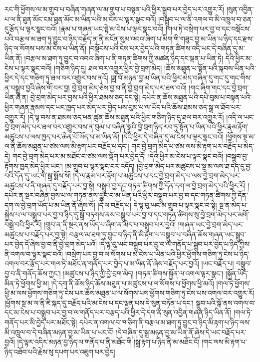 རང་གི་ཕྱོགས་ལ་མ་གྲུབ་པ་བཞིན་གཞན་ལ་མ་གྲུབ་པ་བསྟན་པའི་ཕྱིར་སྒྲུབ་པར་བྱེད་པར་འགྱུར་རོ། །སུན་འབྱིན་པ་ལ་ནི་ཐུན་མོང་ངམ་ཐུན་མོང་མ་ཡིན་པའི་མ་ངེས་པ་ལྟར་སྣང་བའོ། །བསྒྲུབ་པ་ལ་ནི་འགལ་བ་མི་འཁྲུལ་བ་ཅན་དུ་རྩོད་པ་ལྟར་སྣང་བའོ། །རྣམ་པ་གཞན་ཡང་སྟེ་མ་ངེས་པ་ལྟར་སྣང་བའོ། །གལ་ཏེ་བསྲེག་པར་བྱ་བ་དང་བསྡོངས་པའི་བརྩལ་མ་ཐག་ཏུ་བྱུང་བ་ཉིད་བརྗོད་ན་ནི་མངོན་སུམ་འབའ་ཞིག་པ་མིག་གི་གཟུང་བྱ་མ་ཡིན་པ་ཉིད་དང་རྫས་ཉིད་ལ་སོགས་པས་མ་ངེས་པ་ཡིན་ནོ། །བསྡོངས་པའི་ངེས་པར་བྱེད་པའི་གཏན་ཚིགས་འདི་ཡང་དེ་བཞིན་དུ་མ་ཡིན་ནོ། །བརྩལ་མ་ཐག་ཏུ་བྱུང་བ་འབའ་ཞིག་པ་ནི་གཏན་ཚིགས་ཀྱི་མཚན་ཉིད་དང་ལྡན་པ་ཡིན་ཏེ། དེའི་ཕྱིར་མ་ངེས་པ་ལྟར་སྣང་བའོ། །གཅིག་ཉིད་དུ། ཐལ་བར་འགྱུར་ཕྱིར་བྱེ་བྲག་མེད། །ཆོས་མཐུན་པ་སྟོན་པའི་སྐབས་ཡིན་པའི་ཕྱིར་དེ་དང་གཅིག་ཏུ་ཐལ་བར་འགྱུར་བས་ནའོ། །ཟླ་བོ་མཉན་བྱ་མ་ཡིན་པའི་ཕྱིར་མེད་བཞིན་དུ་གང་དུ་གང་གིས་ན་བསྒྲུབ་བྱའི་ཞེས་གོ་བར་བྱ། བྱེ་བྲག་མེད་ཅེས་བྱ་བ་ནི་བྱེ་བྲག་མེད་པར་ཐལ་བའོ། །གང་ཞིག་གང་དང་བྱེ་བྲག་ཡིན་ཞེ་ན། བྱེ་བྲག་མེད་པར་བྱས་པའི་ཕྱིར་ཐམས་ཅད་དང་སྟེ། དཔེར་ན་ཆོས་མཐུན་པའི་དཔེ་བུམ་པ་བསྟན་པའི་ཕྱིར་གཞན་རྣམས་དང་ཡང་ཁྱད་པར་མེད་པར་བྱེད་པས་བུམ་པ་ལ་ཡོད་པའི་ཆོས་ཐམས་ཅད་སྒྲ་ལ་ཐོབ་པར་འགྱུར་རོ། །དེ་ལྟ་བས་ན་ཐམས་ཅད་ཕན་ཚུན་ཆོས་མཐུན་པའི་ཕྱིར་གཅིག་ཉིད་དུ་ཐལ་བར་འགྱུར་རོ། །འདི་ལ་ཡང་བྱེ་བྲག་མེད་པར་ཐལ་བར་འགྱུར་བས་ན་བུམ་པ་བཞིན་སྒྲའི་བྱེ་བྲག་ཉིད་རབ་ཏུ་སྟོན་པ་ཡིན་པའི་ཕྱིར་རྣམ་རྟོག་མཚུངས་པ་ལས་ཁྱད་པར་ཆེན་པོ་ཡོད་པ་མ་ཡིན་ནོ། །དེའི་ཕྱིར་དེ་བཞིན་དུ་མ་ངེས་པ་ལྟར་སྣང་བའོ། །ཕྱོགས་སྔ་མ་ལ་ནི་ཆོས་མཐུན་པ་ཙམ་ལས་མི་རྟག་པར་བརྗོད་པ་དང་། གང་བྱེ་བྲག་མེད་པ་ཙམ་ལས་མི་རྟག་པར་བརྗོད་པ་མེད་དེ། གང་བྱེ་བྲག་མེད་པར་མ་མཐོང་བ་ཙམ་ལས་ལྡོག་པར་བྱེད་དོ། །དེའི་ཕྱིར་མ་ངེས་པ་ལྟར་སྣང་བའོ། །བསྒྲུབ་བྱ་རྟོགས་ཁྱད་མེད་ཕྱིར་ཡང་། །མ་གྲུབ་པ་ལྟར་སྣང་བར་འདོད། །བྱེ་བྲག་མེད་པར་མཚུངས་པ་སྔ་མ་ལས་ཐ་དད་དུ་བྱ་བའི་དོན་དུ་ཡང་གི་སྒྲ་སྨོས་སོ། །དེ་ལ་རྣམ་པར་རྟོག་པ་མཚུངས་པ་དང་བྱེ་བྲག་མེད་པ་ལས་བྱེ་བྲག་མེད་པར་མཚུངས་པ་ནི་གཞན་དུ་བརྗོད་པར་བྱ་སྟེ། བསྒྲུབ་བྱ་དང་གཏན་ཚིགས་ཀྱི་དོན་དག་ལ་བྱེ་བྲག་མེད་པའི་ཕྱིར་རོ། །དཔེར་ན་སྔར་བཞིན་བྱས་པ་ལ་གཏན་ནས་བྱུང་བ་མ་ཡིན་པའི་ཕྱིར་བསྒྲུབ་པར་བྱ་བ་དང་གཏན་ཚིགས་ཀྱི་དོན་དག་ལ་བྱེ་བྲག་ཡོད་པ་མ་ཡིན་ནོ་ཞེས་སོ། །དེ་ལ་བརྗོད་པ། དེ་ལྟ་བུ་ཡང་མ་གྲུབ་པ་ལྟར་སྣང་བ་སྟེ། སྔ་ན་མེད་པ་སྐྱེས་པ་ལ་བསྒྲུབ་པར་བྱ་བ་ཉིད་དུ་སྒྲོ་བཏགས་ནས་བསྒྲུབ་པར་བྱ་བ་དང་གཏན་ཚིགས་སུ་བྱེ་བྲག་མེད་པར་མགོ་བསྒྲེ་བའི་ཕྱིར་རོ། །གྲུབ་ན་ནི་སྔར་ནས་ཡོད་པ་ཞིག་ན་མེད་པ་བསྒྲུབ་པར་བྱའོ། །གཞན་ཡང་བྱེ་བྲག་མེད་པར་མཚུངས་པ་བརྗོད་པར་བྱ་སྟེ། བརྩལ་མ་ཐག་ཏུ་བྱུང་བ་ཉིད་ནི་མི་རྟག་པ་བསྒྲུབ་པ་བཞིན་ཆོས་གཞན་ཡང་སྒྲུབ་པར་བྱེད་དོ་ཞེས་བྱ་བ་ནི་བྱེ་བྲག་མེད་པའོ། །དེ་ལྟ་བུ་ཡང་བསྒྲུབ་པར་བྱ་བ་ལ་གནོད་པ་སྒྲུབ་པར་བྱེད་པ་ཉིད་ཀྱིས་ནི་འགལ་བ་ལྟར་སྣང་བའོ། །བསྲེག་པར་བྱ་བ་ལ་སོགས་པ་མ་ངེས་པ་ཡིན་པའི་ཕྱིར་ཕྱོགས་གཅིག་ཏུ་ངེས་པ་ཉིད་འགལ་བར་རྩོད་པར་གལ་ཏེ་མཐོང་ན་གནོད་པར་བྱེད་པ་མ་ཡིན་ནོ་ཞེས་བརྗོད་པར་བྱའོ། །ཡང་བརྗོད་པ། བསྒྲུབ་བྱ་བ་ནི་གནོད་ཆོས་ཀྱང་། །མཚུངས་པ་ཉིད་ཀྱི་བྱེ་བྲག་མེད། །གཏན་ཚིགས་སྐྱོན་ལ་འགལ་ལྟར་སྣང་། །སྐྱོན་ཡོད་མིན་ཏེ་ཕྱོགས་ཕྱི་མ། །དེ་དག་ནི་ཆོས་ཉིད་ཆོས་མཐུན་པ་མཚུངས་པ་ལ་སོགས་པ་ཕྱོགས་ཕྱི་མའོ། །གལ་ཏེ་ཕྱོགས་ཕྱི་མ་ལས་ཕྱོགས་གཅིག་ཏུ་ངེས་པར་ཆོས་མཐུན་པ་ལ་སོགས་པས་ཕྱོགས་གཅིག་ཏུ་ངེས་པས་འགལ་བར་འགྱུར་རོ། །ཕྱོགས་སྔ་མ་ལ་ནི་ཇི་སྐད་དུ་བརྗོད་པའི་མ་ངེས་པ་དང་ལྡན་པས་དེ་སུན་བཏོན་པ་དང་། སྒྲུབ་པའི་སྒོ་ནས་འགལ་བ་དང་མ་ངེས་པ་བསྒྲུབ་པར་བྱ་བ་ལ་གནོད་པར་བརྩད་པའི་ཕྱིར་དེ་དག་ནི་སུན་འབྱིན་གཞན་ཉིད་ཡིན་ནོ། །གལ་ཏེ་གནོད་པར་མི་བྱེད་པར་མཐོང་སྟེ། དཔེར་ན་འགལ་བ་ཁ་ཅིག་ནི་བརྩལ་མ་ཐག་ཏུ་བྱུང་བ་ཉིད་མི་རྟག་པ་ཉིད་ལས་མི་འཁྲུལ་བ་དེ་བཞིན་མཉན་བྱ་མ་ཡིན་པ་ཡང་ངོ། །དེ་བཞིན་དུ་སྒྲ་མཉན་བྱ་མ་ཡིན་ནོ་ཞེས་དེ་ཡང་བརྗོད་པར་བྱའོ། །དེ་ལྟར་འདིར་མཉན་བྱ་ཉིད་ལ་གནོད་པ་ནི་མཐོང་གི །སྒྲ་རྟག་པ་ཉིད་ནི་མ་མཐོང་ངོ། །གང་ལས་མི་རྟག་པ་ཉིད་འཐོབ་པའི་རྗེས་སུ་དཔག་པར་འཇུག་པར་བྱེད། 